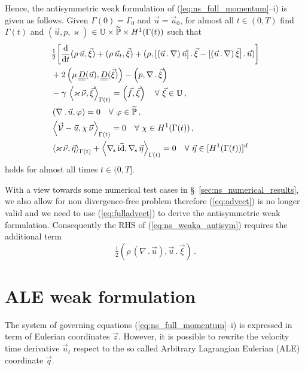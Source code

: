 Hence, the antisymmetric weak formulation of (\ref{eq:ns_full_momentum}--i) is
given as follows. Given $\Gamma(0) = \Gamma_0$ and $\vec u = \vec u_0$, for
almost all $t\in(0,T)$ find $\Gamma(t)$ and ${(\vec u, p, \varkappa)}$ ${\in
\mathbb{U} \times \widetilde{\mathbb{P}} \times H^1(\Gamma(t))}$ such that
\begin{subequations}
\begin{align}
& \tfrac{1}{2}\bigg[ \ddt (\rho\,\vec u, \vec \xi) + (\rho\,\vec u_t, \vec \xi)
+ (\rho, [(\vec u\,.\,\nabla)\,\vec u]\,.\,\vec \xi
- [(\vec u\,.\,\nabla)\,\vec \xi]\,.\,\vec u)\bigg] \nonumber \\
& +2\left(\mu\,\mat D(\vec u), \mat D(\vec \xi)\right)
- \left(p, \nabla\,.\,\vec \xi\right)\nonumber \\
& - \gamma\,\left\langle \varkappa\,\vec\nu, \vec\xi\right\rangle_{\Gamma(t)}
= \left(\vec f, \vec \xi\right)\quad \forall\ \vec\xi \in \uspace \,,
\label{eq:ns_weaka_antisym}\\
& \left(\nabla\,.\,\vec u, \varphi\right) = 0
\quad \forall\ \varphi \in \pnormspace\,, \label{eq:ns_weakb_antisym} \\
&  \left\langle \V
- \vec u, \chi\,\vec\nu \right\rangle_{\Gamma(t)} = 0
\quad \forall\ \chi \in H^1(\Gamma(t))\,, \label{eq:ns_weakc_antisym} \\
& \left\langle \varkappa\,\vec\nu, \vec\eta \right\rangle_{\Gamma(t)}
+ \left\langle \nabs\,\vec \id, \nabs\,\vec \eta \right\rangle_{\Gamma(t)}
= 0  \quad \forall\ \vec\eta \in [H^1(\Gamma(t))]^d\,\label{eq:ns_weakd_antisym}
\end{align}
\end{subequations}
holds for almost all times $t \in (0,T]$.

With a view towards some numerical test cases
in \S~\ref{sec:ns_numerical_results}, we also allow for non divergence-free
problem therefore (\ref{eq:advect}) is no longer valid and we need to use
(\ref{eq:fulladvect}) to derive the antisymmetric weak formulation.
Consequently the RHS of (\ref{eq:ns_weaka_antisym}) requires the additional term
\begin{equation} \label{eq:additionalvelocityrhs}
\tfrac{1}{2}(\rho\,(\nabla\,.\,\vec u ),\vec u\,.\,\vec\xi)\,.
\end{equation}

\section{ALE weak formulation}\label{sec:ns_weak_ale}
The system of governing equations (\ref{eq:ns_full_momentum}--i) is expressed in
term of Eulerian coordinates $\vec z$. However, it is possible to rewrite the
velocity time derivative $\vec u_t$ respect to the so called Arbitrary
Lagrangian Eulerian (ALE) coordinate $\vec q$.

